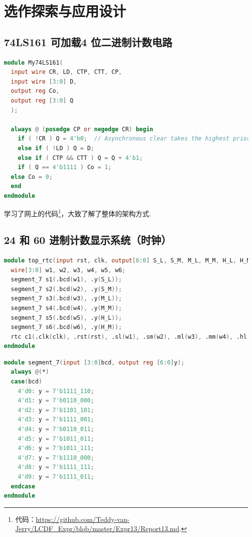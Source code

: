 \documentclass[11pt]{SEU-Digital-Report}
\begin{document}
  \section{选作探索与应用设计}

    \subsection{74LS161 可加载4 位二进制计数电路}

    \begin{lstlisting}[language=verilog, title=My74LS161]
module My74LS161(
  input wire CR, LD, CTP, CTT, CP,
  input wire [3:0] D,
  output reg Co,
  output reg [3:0] Q
  );

  always @ (posedge CP or negedge CR) begin
    if ( !CR ) Q = 4'b0;  // Asynchronous clear takes the highest priority
    else if ( !LD ) Q = D;
    else if ( CTP && CTT ) Q = Q + 4'b1;
    if ( Q == 4'b1111 ) Co = 1;
  else Co = 0;
  end
endmodule
    \end{lstlisting}

    学习了网上的代码\footnote{代码：\url{https://github.com/Teddy-van-Jerry/LCDF_Expr/blob/master/Expr13/Report13.md}.}，大致了解了整体的架构方式.

    \subsection{24 和 60 进制计数显示系统（时钟）}

    

    \begin{lstlisting}[language=verilog, title=TOP.v]
module top_rtc(input rst, clk, output[6:0] S_L, S_M, M_L, M_M, H_L, H_M);
  wire[3:0] w1, w2, w3, w4, w5, w6;
  segment_7 s1(.bcd(w1), .y(S_L));
  segment_7 s2(.bcd(w2), .y(S_M));
  segment_7 s3(.bcd(w3), .y(M_L));
  segment_7 s4(.bcd(w4), .y(M_M));
  segment_7 s5(.bcd(w5), .y(H_L));
  segment_7 s6(.bcd(w6), .y(H_M));
  rtc c1(.clk(clk), .rst(rst), .sl(w1), .sm(w2), .ml(w3), .mm(w4), .hl(w5), .hm(w6));
endmodule
    \end{lstlisting}

        \begin{lstlisting}[language=verilog, title=BCD\_SEVEN\_SEGMENT.v]
module segment_7(input [3:0]bcd, output reg [6:0]y);
  always @(*)
  case(bcd)
    4'd0: y = 7'b1111_110;
    4'd1: y = 7'b0110_000;
    4'd2: y = 7'b1101_101;
    4'd3: y = 7'b1111_001;
    4'd4: y = 7'b0110_011;
    4'd5: y = 7'b1011_011;
    4'd6: y = 7'b1011_111;
    4'd7: y = 7'b1110_000;
    4'd8: y = 7'b1111_111;
    4'd9: y = 7'b1111_011;
  endcase
endmodule
    \end{lstlisting}
\end{document}
